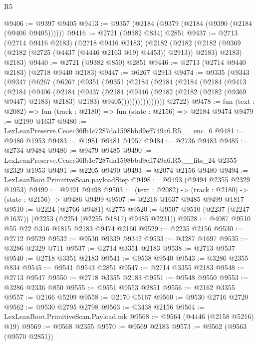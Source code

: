 \begin{lexlean}{R5}
\begin{coremodule}
@9406 := @9397 @9405
@9413 := @9357 (@2184 (@9379 (@2184 (@9390 (@2184 (@9406 @9405))))))
@9416 := @2721 (@9382 @834) @2851
@9437 := @2713
    (@2714 @9416 @2183)
    (@2718 @9416 @2183)
    (@2182
      (@2182 (@2182 (@9369 (@2182 (@2725 (@4437 (@4446 @2163 @19) @4453)) @2913)) @2183) @2183)
      @2183)
@9440 := @2721 (@9382 @850) @2851
@9446 := @2713 (@2714 @9440 @2183) (@2718 @9440 @2183)
@9447 := @6267 @2913
@9474 := @9335
    (@9343
      (@9347
        (@6267
          (@6267
            (@9351
              (@9351
                (@2184
                  (@2184
                    (@2184
                      (@2184
                        (@9413
                          (@2184
                            (@9406
                              (@2184
                                (@9437
                                  (@2184
                                    (@9446
                                      (@2182 (@2182 (@2182 (@9369 @9447) @2183) @2183) @2183)
                                      @9405))))))))))))))))
      @2722)
@9478 := fun (text : @2082) => fun (track : @2180) => fun (state : @2156) => @2184 @9474
@9479 := @2199 @1637
@9480 := LexLeanPreserve.Ceaec36fb1c7287da1598bbd9eff749a6.R5.__enc_6
@9481 := @9480 @1953
@9483 := @1981 @9481 @1957
@9484 := @2736 @9483
@9485 := @2734 @9484
@9486 := @9479 @9485
@9490 := LexLeanPreserve.Ceaec36fb1c7287da1598bbd9eff749a6.R5.__fits_24 @2355 @2329 @1953
@9491 := @2205 @9490
@9493 := @2074 @2156 @9480
@9494 := LexLeanBoot.PrimitiveScan.payloadStep
@9498 := @9493 (@9494 @2355 @2329 @1953)
@9499 := @9491 @9498
@9503 := (text : @2082) -> (track : @2180) -> (state : @2156) -> @9486 @9499
@9507 := @2216 @1637 @9485 @9499 @1817
@9510 := @2224 (@2766 @9481) @2775
@9520 := @9507 @9510 (@2237 (@2247 @1637)) (@2253 (@2254 (@2255 @1817) @9485 @2231))
@9528 := @4087 @9510 @55 @22 @316 @1815 @2183 @9474 @2160
@9529 := @2235 @2156
@9530 := @2712 @9529
@9532 := @9530 @9339 @9342
@9533 := @3287 @1697
@9535 := @3286 @2329 @711
@9537 := @2714 @3351 @2183
@9538 := @2713 @9537
@9540 := @2718 @3351 @2183
@9541 := @9538 @9540
@9543 := @3286 @2355 @834
@9545 := @9541 @9543 @2851
@9547 := @2714 @3355 @2183
@9548 := @2713 @9547
@9550 := @2718 @3355 @2183
@9551 := @9548 @9550
@9553 := @3286 @2336 @850
@9555 := @9551 @9553 @2851
@9556 := @2162 @3355
@9557 := @2166 @5209
@9558 := @2170 @5167
@9560 := @9530 @2716 @2720
@9562 := @9530 @2795 @2798
@9563 := @3438 @2156
@9564 := LexLeanBoot.PrimitiveScan.Payload.mk
@9568 := @9564 (@4446 (@2158 @5216) @19)
@9569 := @9568 @2355
@9570 := @9569 @2183
@9573 := @9562 (@9563 (@9570 @2851))

\end{coremodule}
\end{lexlean}
